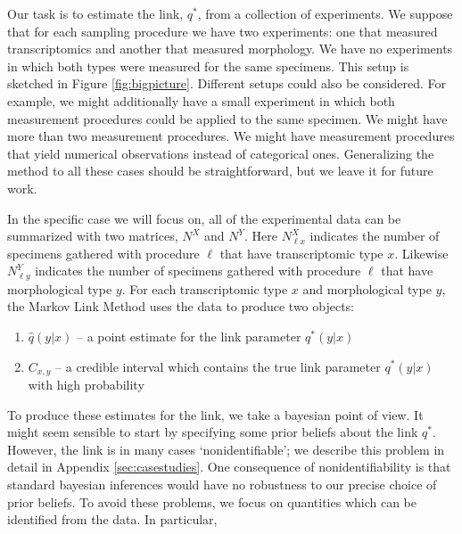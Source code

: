 Our task is to estimate the link, $q^*$, from a collection of experiments.  We suppose that for each sampling procedure we have two experiments: one that measured transcriptomics and another that measured morphology.  We have no experiments in which both types were measured for the same specimens.  This setup is sketched in Figure \ref{fig:bigpicture}.  Different setups could also be considered.   For example, we might additionally have a small experiment in which both measurement procedures could be applied to the same specimen.  We might have more than two measurement procedures.  We might have measurement procedures that yield numerical observations instead of categorical ones.  Generalizing the method to all these cases should be straightforward, but we leave it for future work.  

In the specific case we will focus on, all of the experimental data can be summarized with two matrices, $N^X$ and $N^Y$.  Here $N^X_{\ell x}$ indicates the number of specimens gathered with procedure $\ell$ that have transcriptomic type $x$.  Likewise $N^Y_{\ell y}$ indicates the number of specimens gathered with procedure $\ell$ that have morphological type $y$.  For each transcriptomic type $x$ and morphological type $y$, the Markov Link Method uses the data to produce two objects:
%
\begin{enumerate}
    \item $\hat q(y|x)$ -- a point estimate for the link parameter $q^*(y|x)$
    \item $C_{x,y}$ -- a credible interval which contains the true link parameter $q^*(y|x)$ with high probability
\end{enumerate}
%
To produce these estimates for the link, we take a bayesian point of view.  It might seem sensible to start by specifying some prior beliefs about the link $q^*$.  However, the link is in many cases `nonidentifiable';  we describe this problem in detail in Appendix \ref{sec:casestudies}.  One consequence of nonidentifiability is that standard bayesian inferences would have no robustness to our precise choice of prior beliefs.  To avoid these problems, we focus on quantities which can be identified from the data.  In particular,
